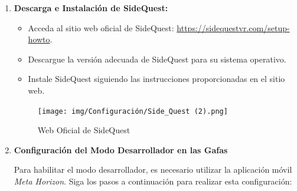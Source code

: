 \begin{enumerate}
    \item \textbf{Descarga e Instalación de SideQuest:}
    \begin{itemize}
        \item Acceda al sitio web oficial de SideQuest: \url{https://sidequestvr.com/setup-howto}.
        \item Descargue la versión adecuada de SideQuest para su sistema operativo.
        \item Instale SideQuest siguiendo las instrucciones proporcionadas en el sitio web.
    \end{itemize}
    \begin{figure}[thbp]
        \centering
        \texttt{[image: img/Configuración/Side\_Quest (2).png]}
        \caption{Web Oficial de SideQuest}
        \label{fig:Web Oficial de SideQuest}
    \end{figure}
    \newpage
    \item \textbf{Configuración del Modo Desarrollador en las Gafas}

    Para habilitar el modo desarrollador, es necesario utilizar la aplicación móvil \textit{Meta Horizon}. Siga los pasos a continuación para realizar esta configuración:
    

\end{enumerate}

